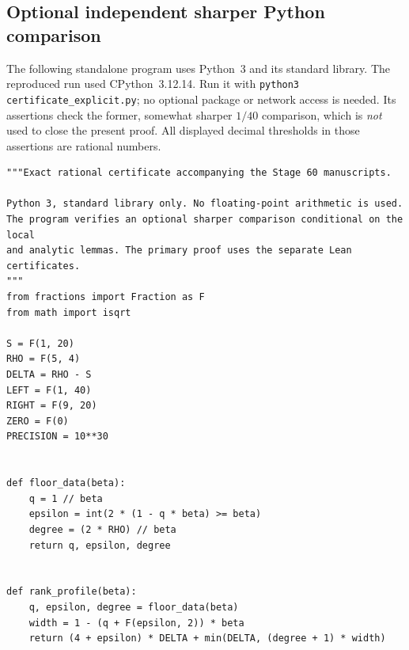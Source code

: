\documentclass[11pt,letterpaper]{article}
\theoremstyle{definition}
\begin{document}
\subsection{Optional independent sharper Python comparison}
The following standalone program uses Python~3 and its standard library.
The reproduced run used CPython~3.12.14. Run it with
\texttt{python3 certificate\_explicit.py}; no optional package or network
access is needed. Its assertions check the former, somewhat sharper $1/40$ comparison,
which is \emph{not} used to close the present proof. All displayed
decimal thresholds in those assertions are rational numbers.
\begin{lstlisting}
"""Exact rational certificate accompanying the Stage 60 manuscripts.

Python 3, standard library only. No floating-point arithmetic is used.
The program verifies an optional sharper comparison conditional on the local
and analytic lemmas. The primary proof uses the separate Lean certificates.
"""
from fractions import Fraction as F
from math import isqrt

S = F(1, 20)
RHO = F(5, 4)
DELTA = RHO - S
LEFT = F(1, 40)
RIGHT = F(9, 20)
ZERO = F(0)
PRECISION = 10**30


def floor_data(beta):
    q = 1 // beta
    epsilon = int(2 * (1 - q * beta) >= beta)
    degree = (2 * RHO) // beta
    return q, epsilon, degree


def rank_profile(beta):
    q, epsilon, degree = floor_data(beta)
    width = 1 - (q + F(epsilon, 2)) * beta
    return (4 + epsilon) * DELTA + min(DELTA, (degree + 1) * width)



\end{lstlisting}
\end{document}
